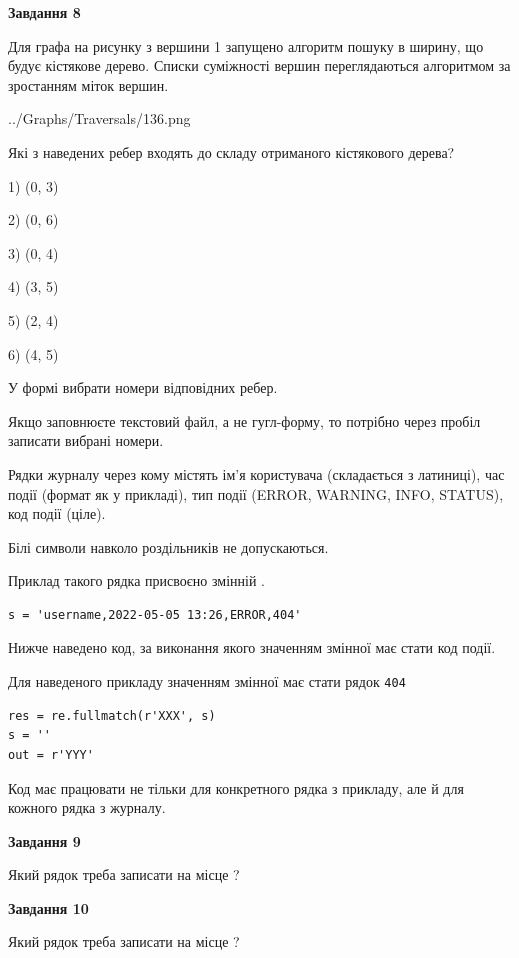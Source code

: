 \documentclass[12pt, ukrainian]{article}
\def\code#1{\Verb!#1!}
\begin{document}
{\begin {large}
{\begin {center}\textbf{Завдання 8}\end {center}}\par
Для графа на рисунку з вершини 1 запущено алгоритм пошуку в ширину, що будує кістякове дерево. Списки суміжності вершин переглядаються алгоритмом за зростанням міток вершин.\par
\begin{center}
	{../Graphs/Traversals/136.png}
\end{center}
\par Які з наведених ребер входять до складу отриманого кістякового дерева?\par
1) (0, 3)\par
2) (0, 6)\par
3) (0, 4)\par
4) (3, 5)\par
5) (2, 4)\par
6) (4, 5)\par
{\vskip 15pt} У формі вибрати номери відповідних ребер.


Якщо заповнюєте текстовий файл, а не гугл-форму, то потрібно через пробіл записа\-ти вибрані номери.\par
\newpage


Рядки журналу через кому містять ім'я користувача (складається з латиниці), час події (фор\-мат як у прикладі), тип події (ERROR, WARNING, INFO, STATUS), код події (ціле).

Білі символи навколо роздільників не допускаються.

Приклад такого рядка присвоєно змінній .



\begin{verbatim}
s = 'username,2022-05-05 13:26,ERROR,404'
\end{verbatim}


Нижче наведено код, за виконання якого значенням змінної  має стати код події.

Для наведеного прикладу значенням змінної  має стати рядок \code{404}



\begin{verbatim}
res = re.fullmatch(r'XXX', s)
s = ''
out = r'YYY'
\end{verbatim}


Код має працювати не тільки для конкретного рядка з прикладу, але й для кожного рядка з журналу.

{\begin {center}\textbf{Завдання 9}\end {center}}\par
Який рядок треба записати на місце  ?\par
\vspace{5mm}


{\begin {center}\textbf{Завдання 10}\end {center}}\par
Який рядок треба записати на місце  ?\par


\newpage


\end {large}}
\end{document}
